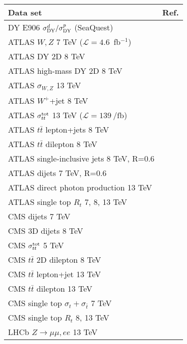 \begin{tabular}{lc}
    \toprule
    Data set
    & Ref.
    \\
    \midrule
    DY E906 $\sigma^d_{\rm DY}/\sigma^p_{\rm DY}$ (SeaQuest)
    & \cite{Dove_2021}
    \\
    \midrule
    ATLAS $W,Z$ 7 TeV ($\mathcal{L}=4.6$~fb$^{-1}$)
    & \cite{Aaboud:2016btc}
    \\
    ATLAS DY 2D 8 TeV
    & \cite{Aaboud:2017ffb}
    \\
    ATLAS high-mass DY 2D 8 TeV
    & \cite{Aad:2016zzw}
    \\
    ATLAS $\sigma_{W,Z}$ 13 TeV
    & \cite{Aad:2016naf}
    \\
    ATLAS $W^+$+jet 8 TeV
    & \cite{Aaboud:2017soa}
    \\
    ATLAS $\sigma_{tt}^{\rm tot}$ 13 TeV ($\mathcal{L} = \SI{139}{\per\femto\barn}$)
    & \cite{Aad:2020tmz}
    \\
    ATLAS $t\bar{t}$ lepton+jets 8 TeV
    & \cite{Aad:2015mbv}
    \\
    ATLAS $t\bar{t}$ dilepton 8 TeV
    & \cite{Aaboud:2016iot}
    \\
    ATLAS single-inclusive jets 8 TeV, R=0.6
    & \cite{Aaboud:2017dvo}
    \\
    ATLAS dijets 7 TeV, R=0.6
    & \cite{Aad:2013tea}
    \\
    ATLAS direct photon production 13 TeV
    & \cite{Aaboud:2017cbm}
    \\
    ATLAS single top $R_{t}$ 7, 8, 13 TeV
    & \cite{Aad:2014fwa,Aaboud:2016ymp,Aaboud:2017pdi}
    \\
    \midrule
    CMS dijets 7 TeV
    & \cite{Chatrchyan:2012bja}
    \\
    CMS 3D dijets 8 TeV
    & \cite{Sirunyan:2017skj}
    \\
    CMS $\sigma_{tt}^{\rm tot}$ 5 TeV
    & \cite{Sirunyan:2017ule}
    \\
    CMS $t\bar{t}$ 2D dilepton 8 TeV
    & \cite{Sirunyan:2017azo}
    \\
    CMS $t\bar{t}$ lepton+jet 13 TeV
    & \cite{Sirunyan:2018wem}
    \\
    CMS $t\bar{t}$ dilepton 13 TeV
    & \cite{Sirunyan:2018ucr}
    \\
    CMS single top $\sigma_{t}+\sigma_{\bar{t}}$ 7 TeV
    & \cite{Chatrchyan:2012ep}
    \\
    CMS single top $R_{t}$ 8, 13 TeV
    & \cite{Khachatryan:2014iya,Sirunyan:2016cdg}
    \\
    \midrule
    LHCb $Z\to \mu\mu, ee$ 13 TeV
    & \cite{Aaij:2016mgv}
    \\
    \bottomrule
\end{tabular}